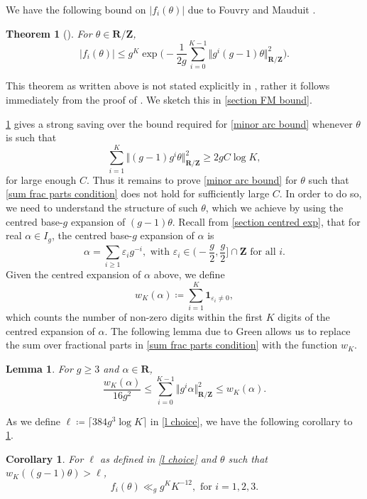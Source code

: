 \documentclass[hidelinks,11pt,reqno]{amsart}
\renewcommand{\leq}{\leqslant}
\renewcommand{\geq}{\geqslant}
\newcommand{\Z}{\ensuremath{\mathbf{Z}}}
\newcommand{\R}{\ensuremath{\mathbf{R}}}
\newcommand{\ind}{\mathbf{1}}
\newcommand{\Vertr}{\Vert_{\R/\Z}}
\newtheorem{lemma}[prop]{Lemma}
\newtheorem{theorem}[prop]{Theorem}
\newtheorem{cor}[prop]{Corollary}
\theoremstyle{remark}
\begin{document}
We have the following bound on $|f_{i}(\theta)|$ due to Fouvry and Mauduit \cite{fouvry2005entiers}.
\begin{theorem}[\cite{fouvry2005entiers}]\label{FM bound 2}
For $\theta \in \R/\Z$,
     \[|f_{i}(\theta)| \leq g^{K}\exp \Big (-\frac{1}{2g}\sum_{i=0}^{K-1}\Vert g^{i}(g-1)\theta\Vertr^{2}\Big ).\]
\end{theorem}
This theorem as written above is not stated explicitly in \cite{fouvry2005entiers}, rather it follows immediately from the proof of \citep[Theorem~1.2]{fouvry2005entiers}. We sketch this in \cref{section FM bound}.

\cref{FM bound 2} gives a strong saving over the bound required for \cref{minor arc bound} whenever $\theta $ is such that
\begin{equation}\label{sum frac parts condition}\sum_{i=1}^{K}\Vert (g-1)g^{i}\theta\Vert_{\R/\Z}^{2}\geq 2gC \log K,\end{equation}
for large enough $C$. Thus it remains to prove \cref{minor arc bound} for $\theta$ such that \cref{sum frac parts condition} does not hold for sufficiently large $C$. In order to do so, we need to understand the structure of such $\theta$, which we achieve by using the centred base-$g$ expansion of $(g-1)\theta$. Recall from \cref{section centred exp}, that for real $\alpha \in I_{g}$, the centred base-$g$ expansion of $\alpha$ is
\[\alpha=\sum_{i\geq 1}\varepsilon_{i}g^{-i}, \textrm{ with }\varepsilon_{i} \in \Big (-\frac{g}{2},\frac{g}{2}\Big ]\cap \Z \textrm{ for all }i.\]
Given the centred expansion of $\alpha$ above, we define 
\[w_{K}(\alpha)\coloneq \sum_{i=1}^{K}\ind_{\varepsilon_{i}\neq 0},\]
which counts the number of non-zero digits within the first $K$ digits of the centred expansion of $\alpha$. The following lemma due to Green allows us to replace the sum over fractional parts in \cref{sum frac parts condition} with the function $w_{K}$.
\begin{lemma}\citep[Lemma~7.2]{green2025waring}\label{lemma: frac part to few non-zero}
For $g\geq 3$ and $\alpha \in \R$,
    \[\frac{w_{K}(\alpha)}{16g^{2}}\leq \sum_{i=0}^{K-1}\Vert g^{i}\alpha\Vertr^{2}\leq w_{K}(\alpha).\]
\end{lemma}
As we define $\ell\coloneq\lceil 384g^{3}\log K \rceil$ in \cref{l choice}, we have the following corollary to \cref{FM bound 2}.
\begin{cor}\label{FM very good g}
    For $\ell$ as defined in \cref{l choice} and $\theta$ such that $w_{K}((g-1)\theta)>\ell$,
    \[f_{i}(\theta)\ll_{g} {g^{K}}{K^{-12}},\textrm{ for }i=1,2,3.\]
\end{cor}
\end{document}
